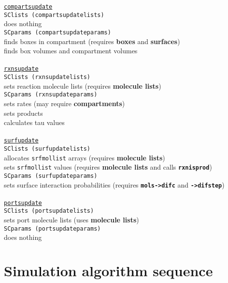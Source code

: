 \documentclass {scrbook}
\newcommand {\ttt} {\texttt}
\begin{document}
\begin{tabbing}
\>\ttt{\underline{compartsupdate}}\\
\>\>\ttt{SClists (compartsupdatelists)}\\
\>\>\>does nothing\\
\>\>\ttt{SCparams (compartsupdateparams)}\\
\>\>\>finds boxes in compartment (requires \textbf{boxes} and \textbf{surfaces})\\
\>\>\>finds box volumes and compartment volumes\\
\>\\
\>\ttt{\underline{rxnsupdate}}\\
\>\>\ttt{SClists (rxnsupdatelists)}\\
\>\>\>sets reaction molecule lists (requires \textbf{molecule lists})\\
\>\>\ttt{SCparams (rxnsupdateparams)}\\
\>\>\>sets rates (may require \textbf{compartments})\\
\>\>\>sets products\\
\>\>\>calculates tau values\\
\>\\
\>\ttt{\underline{surfupdate}}\\
\>\>\ttt{SClists (surfupdatelists)}\\
\>\>\>allocates \ttt{srfmollist} arrays (requires \textbf{molecule lists})\\
\>\>\>sets \ttt{srfmollist} values (requires \textbf{molecule lists} and calls \ttt{\textbf{rxnisprod}})\\
\>\>\ttt{SCparams (surfupdateparams)}\\
\>\>\>sets surface interaction probabilities (requires \ttt{\textbf{mols->difc}} and \ttt{\textbf{->difstep}})\\
\>\\
\>\ttt{\underline{portsupdate}}\\
\>\>\ttt{SClists (portsupdatelists)}\\
\>\>\>sets port molecule lists (uses \textbf{molecule lists})\\
\>\>\ttt{SCparams (portsupdateparams)}\\
\>\>\>does nothing\\
\end{tabbing}

\section{Simulation algorithm sequence}
\end{document}
